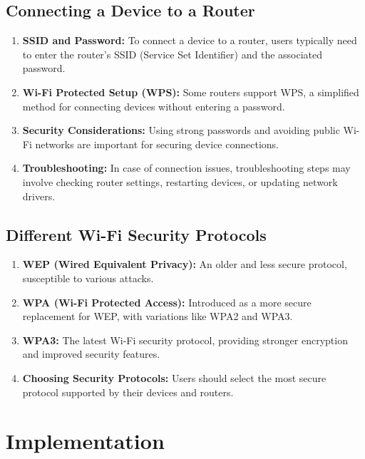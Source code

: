 \documentclass[11pt]{article}
\begin{document}
\subsection{Connecting a Device to a Router}
\begin{enumerate}
  \item \textbf{SSID and Password:} To connect a device to a router, users typically need to enter the router's SSID (Service Set Identifier) and the associated password.

  \item \textbf{Wi-Fi Protected Setup (WPS):} Some routers support WPS, a simplified method for connecting devices without entering a password.

  \item \textbf{Security Considerations:} Using strong passwords and avoiding public Wi-Fi networks are important for securing device connections.

  \item \textbf{Troubleshooting:} In case of connection issues, troubleshooting steps may involve checking router settings, restarting devices, or updating network drivers.

\end{enumerate}

\subsection{Different Wi-Fi Security Protocols}
\begin{enumerate}
  \item \textbf{WEP (Wired Equivalent Privacy):} An older and less secure protocol, susceptible to various attacks.

  \item \textbf{WPA (Wi-Fi Protected Access):} Introduced as a more secure replacement for WEP, with variations like WPA2 and WPA3.

  \item \textbf{WPA3:} The latest Wi-Fi security protocol, providing stronger encryption and improved security features.

  \item \textbf{Choosing Security Protocols:} Users should select the most secure protocol supported by their devices and routers.

\end{enumerate}



\section{Implementation}
\end{document}
